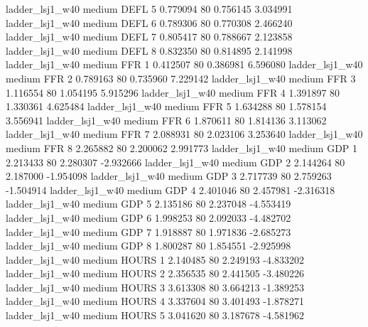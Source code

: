     ladder_lsj1_w40     medium     DEFL                 5  0.779094 80       0.756145           3.034991
    ladder_lsj1_w40     medium     DEFL                 6  0.789306 80       0.770308           2.466240
    ladder_lsj1_w40     medium     DEFL                 7  0.805417 80       0.788667           2.123858
    ladder_lsj1_w40     medium     DEFL                 8  0.832350 80       0.814895           2.141998
    ladder_lsj1_w40     medium      FFR                 1  0.412507 80       0.386981           6.596080
    ladder_lsj1_w40     medium      FFR                 2  0.789163 80       0.735960           7.229142
    ladder_lsj1_w40     medium      FFR                 3  1.116554 80       1.054195           5.915296
    ladder_lsj1_w40     medium      FFR                 4  1.391897 80       1.330361           4.625484
    ladder_lsj1_w40     medium      FFR                 5  1.634288 80       1.578154           3.556941
    ladder_lsj1_w40     medium      FFR                 6  1.870611 80       1.814136           3.113062
    ladder_lsj1_w40     medium      FFR                 7  2.088931 80       2.023106           3.253640
    ladder_lsj1_w40     medium      FFR                 8  2.265882 80       2.200062           2.991773
    ladder_lsj1_w40     medium      GDP                 1  2.213433 80       2.280307          -2.932666
    ladder_lsj1_w40     medium      GDP                 2  2.144264 80       2.187000          -1.954098
    ladder_lsj1_w40     medium      GDP                 3  2.717739 80       2.759263          -1.504914
    ladder_lsj1_w40     medium      GDP                 4  2.401046 80       2.457981          -2.316318
    ladder_lsj1_w40     medium      GDP                 5  2.135186 80       2.237048          -4.553419
    ladder_lsj1_w40     medium      GDP                 6  1.998253 80       2.092033          -4.482702
    ladder_lsj1_w40     medium      GDP                 7  1.918887 80       1.971836          -2.685273
    ladder_lsj1_w40     medium      GDP                 8  1.800287 80       1.854551          -2.925998
    ladder_lsj1_w40     medium    HOURS                 1  2.140485 80       2.249193          -4.833202
    ladder_lsj1_w40     medium    HOURS                 2  2.356535 80       2.441505          -3.480226
    ladder_lsj1_w40     medium    HOURS                 3  3.613308 80       3.664213          -1.389253
    ladder_lsj1_w40     medium    HOURS                 4  3.337604 80       3.401493          -1.878271
    ladder_lsj1_w40     medium    HOURS                 5  3.041620 80       3.187678          -4.581962
